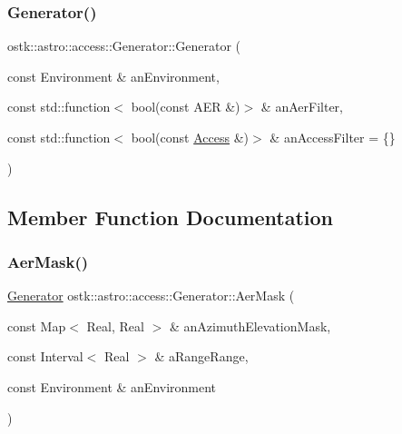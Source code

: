 \mbox{\label{classostk_1_1astro_1_1access_1_1_generator_a2b7303a186ca8c690c0769c5cae0c91e}} 
\subsubsection{\texorpdfstring{Generator()}{Generator()}\hspace{0.1cm}{\footnotesize\ttfamily [2/2]}}
{\footnotesize\ttfamily ostk\+::astro\+::access\+::\+Generator\+::\+Generator (\begin{DoxyParamCaption}\item[{const Environment \&}]{an\+Environment,  }\item[{const std\+::function$<$ bool(const A\+ER \&)$>$ \&}]{an\+Aer\+Filter,  }\item[{const std\+::function$<$ bool(const \hyperlink{classostk_1_1astro_1_1_access}{Access} \&)$>$ \&}]{an\+Access\+Filter = {\ttfamily \{\}} }\end{DoxyParamCaption})}



\subsection{Member Function Documentation}
\mbox{\label{classostk_1_1astro_1_1access_1_1_generator_a023edbe897ad6db339dce2107821442f}} 
\subsubsection{\texorpdfstring{Aer\+Mask()}{AerMask()}}
{\footnotesize\ttfamily \hyperlink{classostk_1_1astro_1_1access_1_1_generator}{Generator} ostk\+::astro\+::access\+::\+Generator\+::\+Aer\+Mask (\begin{DoxyParamCaption}\item[{const Map$<$ Real, Real $>$ \&}]{an\+Azimuth\+Elevation\+Mask,  }\item[{const Interval$<$ Real $>$ \&}]{a\+Range\+Range,  }\item[{const Environment \&}]{an\+Environment }\end{DoxyParamCaption})\hspace{0.3cm}{\ttfamily [static]}}



